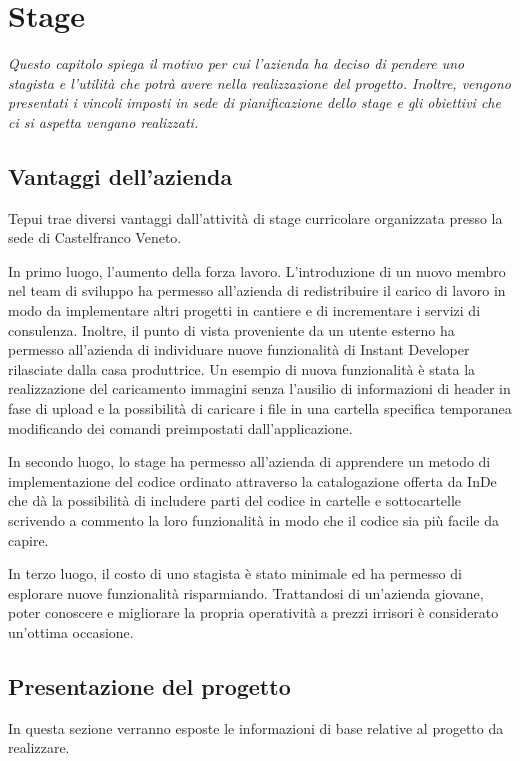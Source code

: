 \chapter{Stage}
\textit{Questo capitolo spiega il motivo per cui l'azienda ha deciso di pendere uno stagista e l'utilità che potrà avere nella realizzazione del progetto. Inoltre, vengono presentati i vincoli imposti in sede di pianificazione dello stage e gli obiettivi che ci si aspetta vengano realizzati.}

\section{Vantaggi dell'azienda}
Tepui trae diversi vantaggi dall'attività di stage curricolare organizzata presso la sede di Castelfranco Veneto.

In primo luogo, l'aumento della forza lavoro. L'introduzione di un nuovo membro nel team di sviluppo ha permesso all'azienda di redistribuire il carico di lavoro in modo da implementare altri progetti in cantiere e di incrementare i servizi di consulenza. Inoltre, il punto di vista proveniente da un utente esterno ha permesso all'azienda di individuare nuove funzionalità di Instant Developer rilasciate dalla casa produttrice.
Un esempio di nuova funzionalità è stata la realizzazione del caricamento immagini senza l'ausilio di informazioni di header in fase di upload e la possibilità di caricare i file in una cartella specifica temporanea modificando dei comandi preimpostati dall'applicazione.

In secondo luogo, lo stage ha permesso all'azienda di apprendere un metodo di implementazione del codice ordinato attraverso la catalogazione offerta da InDe che dà la possibilità di includere parti del codice in cartelle e sottocartelle scrivendo a commento la loro funzionalità in modo che il codice sia più facile da capire.

In terzo luogo, il costo di uno stagista è stato minimale ed ha permesso di esplorare nuove funzionalità risparmiando. Trattandosi di un'azienda giovane, poter conoscere e migliorare la propria operatività a prezzi irrisori è considerato un'ottima occasione. 


\section{Presentazione del progetto}
In questa sezione verranno esposte le informazioni di base relative al progetto da realizzare.
\\


